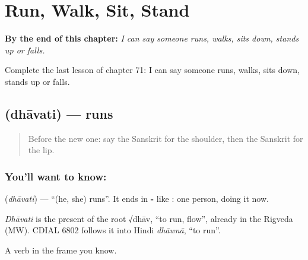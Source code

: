 
\chapter{Run, Walk, Sit, Stand}
\label{ch:sa-run-walk-sit-stand}

\begin{chapteropening}
\textbf{By the end of this chapter:} \emph{I can say someone runs, walks, sits down, stands up or falls.}

Complete the last lesson of chapter 71: I can say someone runs, walks, sits down, stands up or falls.
\end{chapteropening}

\section[\texorpdfstring{\sk{धावति} (dhāvati)}{धावति (dhāvati)}]{ (dhāvati) — runs}

\label{lesson:SA-C71-runs}



\begin{quote}
Before the new one: say the Sanskrit for the shoulder, then the Sanskrit for the lip.
\end{quote}

\subsection*{You'll want to know: }
\textbf{} (\emph{dhāvati}) — \textquotedblleft{}(he, she) runs\textquotedblright{}. It ends in \textbf{-} like \textbf{}: one person, doing it now.

\begin{cousinweb}
\emph{Dhāvati} is the present of the root √dhāv, \textquotedblleft{}to run, flow\textquotedblright{}, already in the Rigveda (MW). CDIAL 6802 follows it into Hindi \emph{dhāwnā}, \textquotedblleft{}to run\textquotedblright{}.
\end{cousinweb}

\begin{grammarlens}[title={What you've built}]
A verb in the frame you know.
\end{grammarlens}

